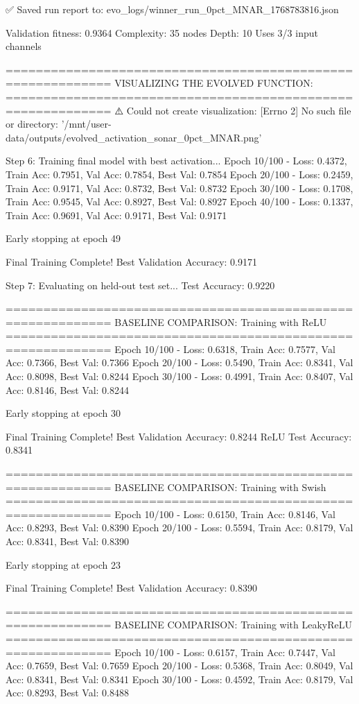 ✅ Saved run report to: evo_logs/winner_run_0pct_MNAR_1768783816.json

Validation fitness: 0.9364
Complexity: 35 nodes
Depth: 10
Uses 3/3 input channels

============================================================
VISUALIZING THE EVOLVED FUNCTION:
============================================================
⚠️ Could not create visualization: [Errno 2] No such file or directory: '/mnt/user-data/outputs/evolved_activation_sonar_0pct_MNAR.png'

Step 6: Training final model with best activation...
Epoch  10/100 - Loss: 0.4372, Train Acc: 0.7951, Val Acc: 0.7854, Best Val: 0.7854
Epoch  20/100 - Loss: 0.2459, Train Acc: 0.9171, Val Acc: 0.8732, Best Val: 0.8732
Epoch  30/100 - Loss: 0.1708, Train Acc: 0.9545, Val Acc: 0.8927, Best Val: 0.8927
Epoch  40/100 - Loss: 0.1337, Train Acc: 0.9691, Val Acc: 0.9171, Best Val: 0.9171

Early stopping at epoch 49

Final Training Complete!
Best Validation Accuracy: 0.9171

Step 7: Evaluating on held-out test set...
Test Accuracy: 0.9220

============================================================
BASELINE COMPARISON: Training with ReLU
============================================================
Epoch  10/100 - Loss: 0.6318, Train Acc: 0.7577, Val Acc: 0.7366, Best Val: 0.7366
Epoch  20/100 - Loss: 0.5490, Train Acc: 0.8341, Val Acc: 0.8098, Best Val: 0.8244
Epoch  30/100 - Loss: 0.4991, Train Acc: 0.8407, Val Acc: 0.8146, Best Val: 0.8244

Early stopping at epoch 30

Final Training Complete!
Best Validation Accuracy: 0.8244
ReLU Test Accuracy: 0.8341

============================================================
BASELINE COMPARISON: Training with Swish
============================================================
Epoch  10/100 - Loss: 0.6150, Train Acc: 0.8146, Val Acc: 0.8293, Best Val: 0.8390
Epoch  20/100 - Loss: 0.5594, Train Acc: 0.8179, Val Acc: 0.8341, Best Val: 0.8390

Early stopping at epoch 23

Final Training Complete!
Best Validation Accuracy: 0.8390

============================================================
BASELINE COMPARISON: Training with LeakyReLU
============================================================
Epoch  10/100 - Loss: 0.6157, Train Acc: 0.7447, Val Acc: 0.7659, Best Val: 0.7659
Epoch  20/100 - Loss: 0.5368, Train Acc: 0.8049, Val Acc: 0.8341, Best Val: 0.8341
Epoch  30/100 - Loss: 0.4592, Train Acc: 0.8179, Val Acc: 0.8293, Best Val: 0.8488

